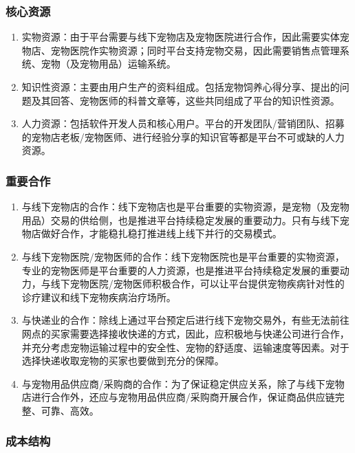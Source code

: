 \documentclass[a4paper]{ctexart}
\begin{document}
\subsubsection{核心资源}

\begin{enumerate}[label=\alph*.]
  \item 实物资源：由于平台需要与线下宠物店及宠物医院进行合作，因此需要实体宠物店、宠物医院作实物资源；同时平台支持宠物交易，因此需要销售点管理系统、宠物（及宠物用品）运输系统。
  \item 知识性资源：主要由用户生产的资料组成。包括宠物饲养心得分享、提出的问题及其回答、宠物医师的科普文章等，这些共同组成了平台的知识性资源。
  \item 人力资源：包括软件开发人员和核心用户。平台的开发团队/营销团队、招募的宠物店老板/宠物医师、进行经验分享的知识官等都是平台不可或缺的人力资源。
\end{enumerate}

\subsubsection{重要合作}

\begin{enumerate}[label=\alph*.]
  \item 与线下宠物店的合作：线下宠物店也是平台重要的实物资源，是宠物（及宠物用品）交易的供给侧，也是推进平台持续稳定发展的重要动力。只有与线下宠物店做好合作，才能稳扎稳打推进线上线下并行的交易模式。
  \item 与线下宠物医院/宠物医师的合作：线下宠物医院也是平台重要的实物资源，专业的宠物医师是平台重要的人力资源，也是推进平台持续稳定发展的重要动力，与线下宠物医院/宠物医师积极合作，可以让平台提供宠物疾病针对性的诊疗建议和线下宠物疾病治疗场所。
  \item 与快递业的合作：除线上通过平台预定后进行线下宠物交易外，有些无法前往网点的买家需要选择接收快递的方式，因此，应积极地与快递公司进行合作，并充分考虑宠物运输过程中的安全性、宠物的舒适度、运输速度等因素。对于选择快递收取宠物的买家也要做到充分的保障。
  \item 与宠物用品供应商/采购商的合作：为了保证稳定供应关系，除了与线下宠物店进行合作外，还应与宠物用品供应商/采购商开展合作，保证商品供应链完整、可靠、高效。
\end{enumerate}

\subsubsection{成本结构}
\end{document}
